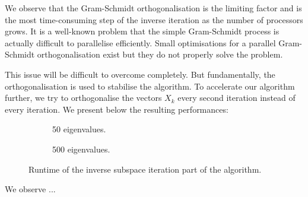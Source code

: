 We observe that the Gram-Schmidt orthogonalisation is the limiting factor and is the most time-consuming step of the inverse iteration as the number of processors grows.
It is a well-known problem that the simple Gram-Schmidt process is actually difficult to parallelise efficiently.
Small optimisations for a parallel Gram-Schmidt orthogonalisation exist \cite{katagiri_parallel_gram_schmidt_2003} but they do not properly solve the problem.

This issue will be difficult to overcome completely.
But fundamentally, the orthogonalisation is used to stabilise the algorithm.
To accelerate our algorithm further, we try to orthogonalise the vectors \(X_k\) every second iteration instead of every iteration.
We present below the resulting performances:

\begin{figure}[H]
  \centering
  \begin{subfigure}[b]{0.5\textwidth}
   
   \caption{50 eigenvalues.}
  \end{subfigure}
  \begin{subfigure}[b]{0.45\textwidth}
   
   \caption{500 eigenvalues.}
  \end{subfigure}
  \caption{Runtime of the inverse subspace iteration part of the algorithm.}
\end{figure}

We observe ...

